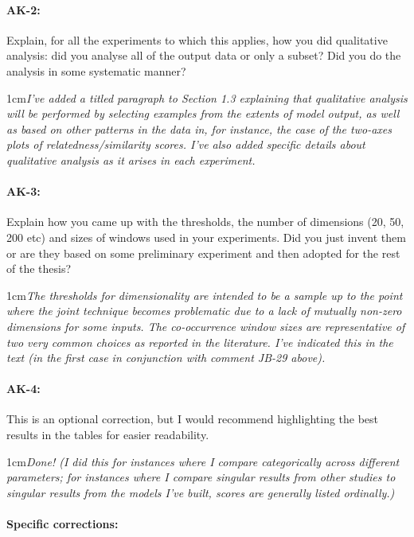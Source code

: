 \documentclass[11pt,a4paper]{article}
\newcommand{\res}[1]{\vspace{0.25cm} \begin{adjustwidth}{1cm}{}\emph{#1}\end{adjustwidth}}
\begin{document}
\paragraph{AK-2:} Explain, for all the experiments to which this applies, how you did qualitative analysis: did you analyse all of the output data or only a subset? Did you do the analysis in some systematic manner?

\res{I've added a titled paragraph to Section 1.3 explaining that qualitative analysis will be performed by selecting examples from the extents of model output, as well as based on other patterns in the data in, for instance, the case of the two-axes plots of relatedness/similarity scores.  I've also added specific details about qualitative analysis as it arises in each experiment.}

\paragraph{AK-3:} Explain how you came up with the thresholds, the number of dimensions (20, 50, 200 etc) and sizes of windows used in your experiments. Did you just invent them or are they based on some preliminary experiment and then adopted for the rest of the thesis?

\res{The thresholds for dimensionality are intended to be a sample up to the point where the joint technique becomes problematic due to a lack of mutually non-zero dimensions for some inputs.  The co-occurrence window sizes are representative of two very common choices as reported in the literature.  I've indicated this in the text (in the first case in conjunction with comment JB-29 above).}

\paragraph{AK-4:} This is an optional correction, but I would recommend highlighting the best results in the tables for easier readability.

\res{Done!  (I did this for instances where I compare categorically across different parameters; for instances where I compare singular results from other studies to singular results from the models I've built, scores are generally listed ordinally.)}

\paragraph{Specific corrections:}
\end{document}
